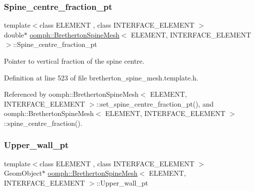 \subsubsection{\texorpdfstring{Spine\+\_\+centre\+\_\+fraction\+\_\+pt}{Spine\_centre\_fraction\_pt}}
{\footnotesize\ttfamily template$<$class E\+L\+E\+M\+E\+NT , class I\+N\+T\+E\+R\+F\+A\+C\+E\+\_\+\+E\+L\+E\+M\+E\+NT $>$ \\
double$\ast$ \hyperlink{classoomph_1_1BrethertonSpineMesh}{oomph\+::\+Bretherton\+Spine\+Mesh}$<$ E\+L\+E\+M\+E\+NT, I\+N\+T\+E\+R\+F\+A\+C\+E\+\_\+\+E\+L\+E\+M\+E\+NT $>$\+::Spine\+\_\+centre\+\_\+fraction\+\_\+pt\hspace{0.3cm}{\ttfamily [protected]}}



Pointer to vertical fraction of the spine centre. 



Definition at line 523 of file bretherton\+\_\+spine\+\_\+mesh.\+template.\+h.



Referenced by oomph\+::\+Bretherton\+Spine\+Mesh$<$ E\+L\+E\+M\+E\+N\+T, I\+N\+T\+E\+R\+F\+A\+C\+E\+\_\+\+E\+L\+E\+M\+E\+N\+T $>$\+::set\+\_\+spine\+\_\+centre\+\_\+fraction\+\_\+pt(), and oomph\+::\+Bretherton\+Spine\+Mesh$<$ E\+L\+E\+M\+E\+N\+T, I\+N\+T\+E\+R\+F\+A\+C\+E\+\_\+\+E\+L\+E\+M\+E\+N\+T $>$\+::spine\+\_\+centre\+\_\+fraction().

\mbox{\label{classoomph_1_1BrethertonSpineMesh_a1f97e78a12000afcc1bd754102b5b51a}} 
\subsubsection{\texorpdfstring{Upper\+\_\+wall\+\_\+pt}{Upper\_wall\_pt}}
{\footnotesize\ttfamily template$<$class E\+L\+E\+M\+E\+NT , class I\+N\+T\+E\+R\+F\+A\+C\+E\+\_\+\+E\+L\+E\+M\+E\+NT $>$ \\
Geom\+Object$\ast$ \hyperlink{classoomph_1_1BrethertonSpineMesh}{oomph\+::\+Bretherton\+Spine\+Mesh}$<$ E\+L\+E\+M\+E\+NT, I\+N\+T\+E\+R\+F\+A\+C\+E\+\_\+\+E\+L\+E\+M\+E\+NT $>$\+::Upper\+\_\+wall\+\_\+pt\hspace{0.3cm}{\ttfamily [protected]}}



